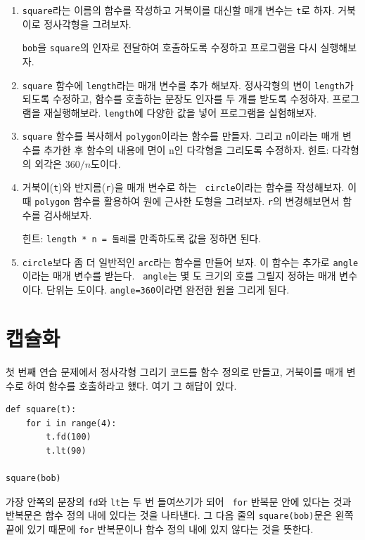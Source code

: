 \documentclass[10pt]{book}
\begin{document}
\begin{enumerate}

\item {\tt square}라는 이름의 함수를 작성하고 거북이를 대신할 매개
  변수는 {\tt t}로 하자.  거북이로 정사각형을 그려보자.

  {\tt bob}을 {\tt square}의 인자로 전달하여 호출하도록 수정하고
  프로그램을 다시 실행해보자.


\item {\tt square} 함수에 {\tt length}라는 매개 변수를 추가 해보자.
  정사각형의 변이 {\tt length}가 되도록 수정하고, 함수를 호출하는
  문장도 인자를 두 개를 받도록 수정하자.  프로그램을 재실행해보라.
  {\tt length}에 다양한 값을 넣어 프로그램을 실험해보자.


\item {\tt square} 함수를 복사해서 {\tt polygon}이라는 함수를 만들자.
  그리고 {\tt n}이라는 매개 변수를 추가한 후 함수의 내용에 면이 n인
  다각형을 그리도록 수정하자.  힌트: 다각형의 외각은
  $360/n$도이다.
   

\item 거북이({\tt t})와 반지름({\tt r})을 매개 변수로 하는 {\tt
    circle}이라는 함수를 작성해보자.  이 때 {\tt polygon} 함수를
  활용하여 원에 근사한 도형을 그려보자.  {\tt r}의 변경해보면서 함수를
  검사해보자.
   

  힌트: {\tt length * n = 둘레}를 만족하도록 값을 정하면 된다.

\item {\tt circle}보다 좀 더 일반적인 {\tt arc}라는 함수를 만들어
  보자.  이 함수는 추가로 {\tt angle}이라는 매개 변수를 받는다.  {\tt
    angle}는 몇 도 크기의 호를 그릴지 정하는 매개 변수이다.  단위는
  도이다.  {\tt angle=360}이라면 완전한 원을 그리게 된다.

\end{enumerate}


\section{캡슐화}

첫 번째 연습 문제에서 정사각형 그리기 코드를 함수 정의로 만들고,
거북이를 매개 변수로 하여 함수를 호출하라고 했다.  여기 그 해답이
있다.


\begin{verbatim}
def square(t):
    for i in range(4):
        t.fd(100)
        t.lt(90)

square(bob)
\end{verbatim}
%
가장 안쪽의 문장의 {\tt fd}와 {\tt lt}는 두 번 들여쓰기가 되어 {\tt
  for} 반복문 안에 있다는 것과 반복문은 함수 정의 내에 있다는 것을
나타낸다.  그 다음 줄의 {\tt square(bob)}문은 왼쪽 끝에 있기 때문에
{\tt for} 반복문이나 함수 정의 내에 있지 않다는 것을 뜻한다.
\end{document}
